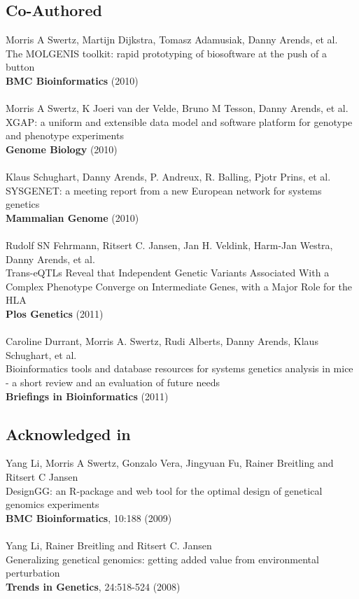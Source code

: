 \documentclass[11pt, twoside, a5paper]{report}
\newcommand{\authors}[1]{\small{#1}}
\newcommand{\bold}[1]{{\bfseries #1}}
\begin{document}
\subsection*{Co-Authored}
  \authors{Morris A Swertz, Martijn Dijkstra, Tomasz Adamusiak, Danny Arends, et al.}\\
  The MOLGENIS toolkit: rapid prototyping of biosoftware at the push of a button\\
  \bold{BMC Bioinformatics} (2010)\\\\
  \authors{Morris A Swertz, K Joeri van der Velde, Bruno M Tesson, Danny Arends, et al.}\\
  XGAP: a uniform and extensible data model and software platform for genotype and phenotype experiments\\
  \bold{Genome Biology} (2010)\\\\
  \authors{Klaus Schughart, Danny Arends, P. Andreux, R. Balling, Pjotr Prins, et al.}\\
  SYSGENET: a meeting report from a new European network for systems genetics\\
  \bold{Mammalian Genome} (2010)\\\\
  \authors{Rudolf SN Fehrmann, Ritsert C. Jansen, Jan H. Veldink, Harm-Jan Westra, Danny Arends, et al.}\\
  Trans-eQTLs Reveal that Independent Genetic Variants Associated With a Complex Phenotype Converge on Intermediate Genes, with a Major Role for the HLA\\
  \bold{Plos Genetics} (2011)\\\\
  \authors{Caroline Durrant, Morris A. Swertz, Rudi Alberts, Danny Arends, Klaus Schughart, et al.}\\
  Bioinformatics tools and database resources for systems genetics analysis in mice - a short review and an evaluation of future needs\\
  \bold{Briefings in Bioinformatics} (2011)

\subsection*{Acknowledged in}
  \authors{Yang Li, Morris A Swertz, Gonzalo Vera, Jingyuan Fu, Rainer Breitling and Ritsert C Jansen}\\
  DesignGG: an R-package and web tool for the optimal design of genetical genomics experiments\\
  \bold{BMC Bioinformatics}, 10:188 (2009)\\\\
  \authors{Yang Li, Rainer Breitling and Ritsert C. Jansen}\\
  Generalizing genetical genomics: getting added value from environmental perturbation\\
  \bold{Trends in Genetics}, 24:518-524 (2008)



\end{document}
